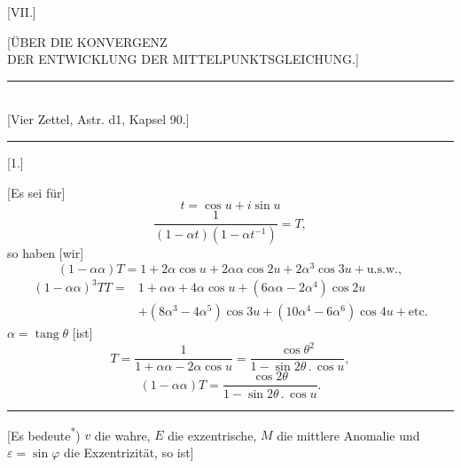 \clearpage{}\NoSourceHead
\begingroup\makeatletter\let\veqno\@@leqno\makeatother
\newcommand{\vsroot}[1]{\mathord{\vcenter{\hbox{\Large\(\surd\)}}}#1}
\begin{center}[VII.]\par\medskip\large [ÜBER DIE KONVERGENZ\\DER ENTWICKLUNG DER MITTELPUNKTSGLEICHUNG.]\end{center}
\begin{center}\rule{.36\linewidth}{.4pt}\\[2pt]{\small [Vier Zettel, Astr. d{\scriptsize 1}, Kapsel {\scriptsize 90}.]}\\[-2pt]\rule{.36\linewidth}{.4pt}\end{center}
\begin{center}[1.]\end{center}
\par
\noindent\hspace*{\parindent}[Es sei für]
\begin{equation}t=\cos u+i\sin u\tag*{[1]}\end{equation}
\begin{equation}\frac{1}{(1-\alpha t)(1-\alpha t^{-1})}=T,\tag*{[2]}\end{equation}
\noindent so haben [wir]
\begin{equation}(1-\alpha\alpha)T=1+2\alpha\cos u+2\alpha\alpha\cos 2u+2\alpha^3\cos 3u+\text{u.s.w.},\tag*{[3]}\end{equation}
\[\begin{aligned}
(1-\alpha\alpha)^3TT={}&1+\alpha\alpha+4\alpha\cos u+(6\alpha\alpha-2\alpha^4)\cos 2u\\
 &+(8\alpha^3-4\alpha^5)\cos 3u+(10\alpha^4-6\alpha^6)\cos 4u+\text{etc.}
\end{aligned}\]
\noindent [Für] \(\alpha=\operatorname{tang}\theta\) [ist]
\begin{equation}T=\frac{1}{1+\alpha\alpha-2\alpha\cos u}=\frac{\cos\theta^2}{1-\sin 2\theta\,{.}\,\cos u},\tag*{[4]}\end{equation}
\begin{equation}(1-\alpha\alpha)T=\frac{\cos 2\theta}{1-\sin 2\theta\,{.}\,\cos u}.\tag*{[5]}\end{equation}
\begin{center}\rule{.24\linewidth}{.4pt}\end{center}
\noindent\hspace*{\parindent}[Es bedeute\textsuperscript{*}) \(v\) die wahre, \(E\) die exzentrische, \(M\) die mittlere Anomalie und \(\varepsilon=\sin\varphi\) die Exzentrizität, so ist]
